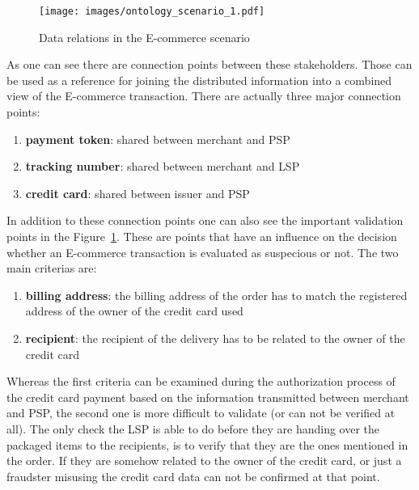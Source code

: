 \begin{figure}[!ht]
  \centering
  \texttt{[image: images/ontology\_scenario\_1.pdf]}
  \caption{Data relations in the \gls{E-commerce} scenario\protect\footnotemark}
\label{fig:images_data_model}
\end{figure}

As one can see there are connection points between these stakeholders. Those can be used as a reference for joining the distributed information into a combined view of the \gls{E-commerce} transaction. There are actually three major connection points: \@

\begin{enumerate}
  \item \textbf{payment token}: shared between merchant and \gls{PSP}
  \item \textbf{tracking number}: shared between merchant and \gls{LSP}
  \item \textbf{credit card}: shared between issuer and \gls{PSP}
\end{enumerate}

In addition to these connection points one can also see the important validation points in the Figure~\ref{fig:images_data_model}. These are points that have an influence on the decision whether an \gls{E-commerce} transaction is evaluated as suspecious or not. The two main criterias are: \@

\begin{enumerate}
  \item \textbf{billing address}: the billing address of the order has to match the registered address of the owner of the credit card used
  \item \textbf{recipient}: the recipient of the delivery has to be related to the owner of the credit card
\end{enumerate}


Whereas the first criteria can be examined during the authorization process of the credit card payment based on the information transmitted between merchant and \gls{PSP}, the second one is more difficult to validate (or can not be verified at all). The only check the \gls{LSP} is able to do before they are handing over the packaged items to the recipients, is to verify that they are the ones mentioned in the order. If they are somehow related to the owner of the credit card, or just a fraudster misusing the credit card data can not be confirmed at that point. \\

